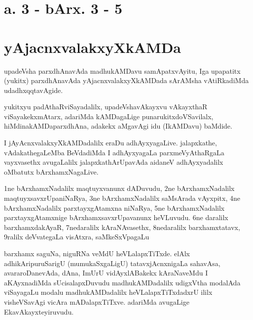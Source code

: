 \section*{a. 3 - bArx. 3 - 5}
\section*{yAjacnxvalakxyXkAMDa}

\centerline{}

\begin{artha}
upadeVsha parxdhAnavAda madhukAMDavu samApatxvAyitu, Iga upa\-patitx (yukitx) parxdhAnavAda 
yAjacnxvalakxyXkAMDada sArAMsha vAtiRkadiMda udadhxqqtavAgide.

yukitxyu padAthaRviSayadalilx, upadeVshavAkayxvu vAkayxthaR viSayakekx\-mAtarx, adariMda 
kAMDagaLige punarukitxdoVSavilalx, hiMdinakAMDaparxdhAna, adakekx aMgavAgi idu 
(IkAMDavu) baMdide.  
\end{artha}

\centerline{}

I jAyAcnxvalakxyXkAMDadalilx eraDu adhAyxyagaLive. jalapxkathe, vAdakathegaLeMba BeVdadiMda 
I adhAyxyagaLa parxmeVyAthaRgaLa vayxvasethx avugaLalilx jalapxkathA\-rUpavAda aidaneV 
adhAyxyadalilx oMbatutx bArxhamxNagaLive.

\centerline{}

\begin{artha}
1ne bArxhamxNadalilx maqtuyxvanunx dADuvudu, 2ne bArxhamxNadalilx maqtuyxsavxrUpa\-niNaRya, 3ne bArxhamxNadalilx saMsArada vAyxpitx, 4ne bArxhamxNadalilx parxtayxgAtamxna \-niNaRya, 5ne bArxhamxNadalilx parxtayxgAtamxnige bArxhamxsavxrUpavanunx heVLuvudu. 6ne daralilx barxhamxda\-kAyaR, 7nedaralilx kAraNAvasethx, 8nedaralilx barxhamxtatavx, 9ralilx deVvategaLa visAtxra, saMkeSxVpagaLu 

barxhamx saguNa, niguRNa veMdU heVLalapxTiTxde. elAlx adhikAri\-puruSarigU (mumukaSxgaLigU) tatavxjAcnxnigaLa sahavAsa, avararoDanevAda, dAna, ImUrU vidAyxlABakekx kAraNaveMdu I aKAyxnadiMda sUcisalapxDuvudu madhukAMDadalilx udigxVtha modalAda viSayagaLu modalu madhukAMDadalilx heVLalapxTiTxdadxrU ililx visheVSavAgi vicAra mADalapxTiTxve. adariMda avugaLige EkavAkayxteyiruvudu.
\end{artha}

